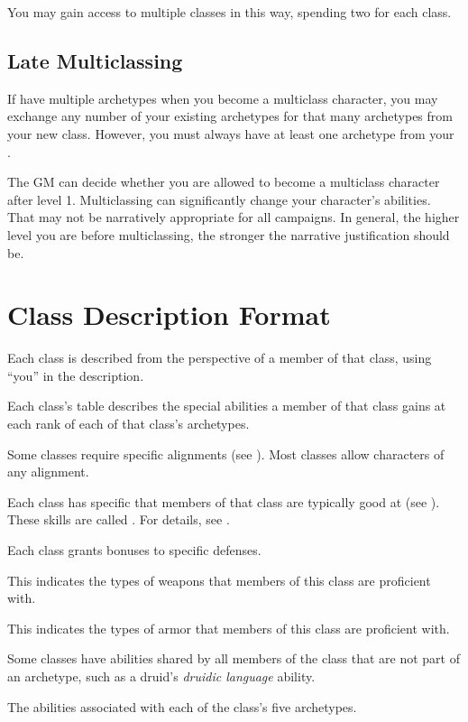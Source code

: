     You may gain access to multiple classes in this way, spending two  for each class.

  \subsection{Late Multiclassing}
    If have multiple archetypes when you become a multiclass character, you may exchange any number of your existing archetypes for that many archetypes from your new class.
    However, you must always have at least one archetype from your .

    The GM can decide whether you are allowed to become a multiclass character after level 1.
    Multiclassing can significantly change your character's abilities.
    That may not be narratively appropriate for all campaigns.
    In general, the higher level you are before multiclassing, the stronger the narrative justification should be.

\section{Class Description Format}
  Each class is described from the perspective of a member of that class, using ``you'' in the description.

  Each class's table describes the special abilities a member of that class gains at each rank of each of that class's archetypes.

  Some classes require specific alignments (see ).
  Most classes allow characters of any alignment.

  Each class has specific  that members of that class are typically good at (see ).
  These skills are called .
  For details, see .

  Each class grants bonuses to specific defenses.

  This indicates the types of weapons that members of this class are proficient with.

  This indicates the types of armor that members of this class are proficient with.

  Some classes have abilities shared by all members of the class that are not part of an archetype, such as a druid's \textit{druidic language} ability.

  The abilities associated with each of the class's five archetypes.

  
